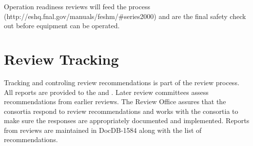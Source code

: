 Operation readiness reviews will feed the \fnal process
(http://eshq.fnal.gov/manuals/feshm/\#series2000) and are the final
safety check out before equipment can be operated.

\section{Review Tracking}

Tracking and controling review recommendations is part of the review
process. All reports are provided to the  and
. Later review committees assess recommendations from
earlier reviews. The Review Office  assures that the consortia respond to
review recommendations and works with the consortia to make sure the
responses are appropriately documented and implemented. Reports from
 reviews are maintained in DocDB-1584\cite{bib:docdb1584}
along with the list of recommendations.
